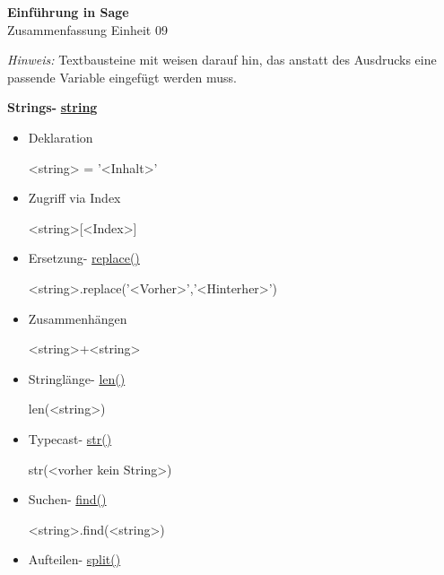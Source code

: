\documentclass[a4paper,9pt,DIV15,twocolumn]{scrartcl}
\begin{document}
\begin{center}
    \textbf{\LARGE Einführung in Sage}\\
    {\large Zusammenfassung Einheit 09}
\end{center}
\textsl{Hinweis:} Textbausteine mit  weisen darauf hin, das anstatt des Ausdrucks eine passende Variable eingefügt werden muss.

\medskip

\textbf{Strings- }\href{http://docs.python.org/library/string.html?highlight=string.replace#string-constants}{\textbf{string}}
\begin{itemize}
 \item Deklaration
\begin{sagein}
<string> = '<Inhalt>'
\end{sagein}
\item Zugriff via Index
\begin{sagein}
<string>[<Index>]
\end{sagein}
\item Ersetzung- \href{http://docs.python.org/library/string.html?highlight=string.replace#string.replace}{replace()}
\begin{sagein}
<string>.replace('<Vorher>','<Hinterher>')
\end{sagein}
\item Zusammenhängen
\begin{sagein}
 <string>+<string>
\end{sagein}
\item Stringlänge- \href{http://docs.python.org/library/functions.html?highlight=print#len}{len()}
\begin{sagein}
 len(<string>)
\end{sagein}
\item Typecast- \href{http://docs.python.org/library/functions.html?highlight=print#str}{str()}
\begin{sagein}
str(<vorher kein String>)
\end{sagein}
\item Suchen- \href{http://docs.python.org/library/string.html?highlight=string.replace#string.find}{find()}
\begin{sagein}
 <string>.find(<string>)
\end{sagein}
\item Aufteilen- \href{http://docs.python.org/library/string.html?highlight=string.replace#string.split}{split()}
\begin{sagein}

\end{sagein}
\end{itemize}
\end{document}
